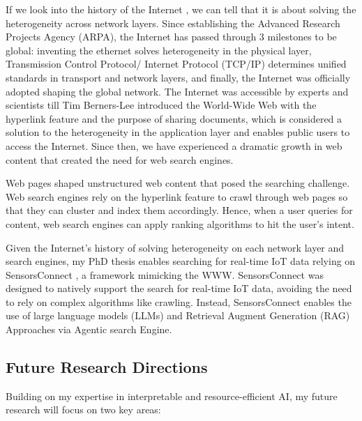 \documentclass[10pt, letterpaper]{article}
\begin{document}
If we look into the history of the Internet \cite{internet_history}, we can tell that it is about solving the heterogeneity across network layers. Since establishing the Advanced Research Projects Agency (ARPA), the Internet has passed through 3 milestones to be global: inventing the ethernet solves heterogeneity in the physical layer, Transmission Control Protocol/ Internet Protocol (TCP/IP) determines unified standards in transport and network layers, and finally, the Internet was officially adopted shaping the global network. The Internet was accessible by experts and scientists till Tim Berners-Lee \cite{www} introduced the World-Wide Web with the hyperlink feature and the purpose of sharing documents, which is considered a solution to the heterogeneity in the application layer and enables public users to access the Internet. Since then, we have experienced a dramatic growth in web content that created the need for web search engines. \vspace{0.2cm}

Web pages shaped unstructured web content that posed the searching challenge. Web search engines \cite{brin1998anatomy} rely on the hyperlink feature to crawl through web pages so that they can cluster and index them accordingly. Hence, when a user queries for content, web search engines can apply ranking algorithms to hit the user's intent.  \vspace{0.2cm}

Given the Internet's history of solving heterogeneity on each network layer and search engines, my PhD thesis enables searching for real-time IoT data relying on SensorsConnect \cite{SensorsConnect}, a framework mimicking the WWW. SensorsConnect was designed to natively support the search for real-time IoT data, avoiding the need to rely on complex algorithms like crawling. Instead, SensorsConnect enables the use of large language models (LLMs) and Retrieval Augment Generation  (RAG) Approaches via Agentic  \cite{elewah2025agentic} search Engine. 


\subsection*{Future Research Directions}
Building on my expertise in interpretable and resource-efficient AI, my future research will focus on two key areas:
\end{document}
